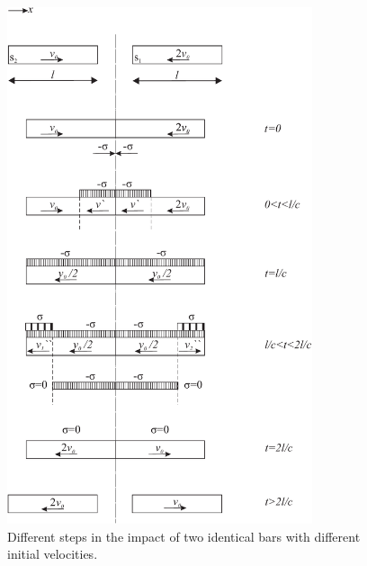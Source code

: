 \documentclass{article}
\begin{document}
\begin{figure}
    \centering
    \includegraphics[width = 0.8\textwidth ]{figures/impact_of_two_bars.pdf}
    \caption{Different steps in the impact of two identical bars with different initial velocities.}
    \label{fig:p1}
\end{figure}


% 
% 
\end{document}

